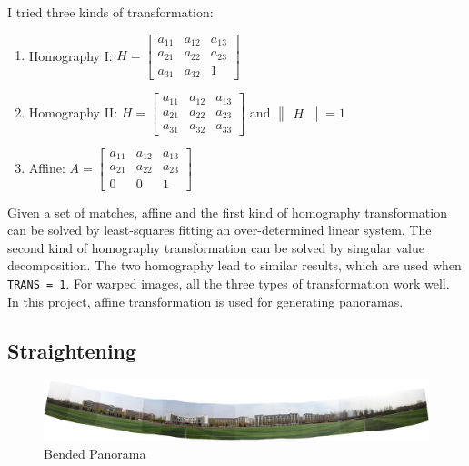 I tried three kinds of transformation:
\begin{enumerate}
  \item Homography I: $H = \begin{bmatrix} a_{11} &a_{12} & a_{13}\\ a_{21} & a_{22} & a_{23}\\ a_{31} & a_{32} & 1\end{bmatrix}$

  \item Homography II:
    $H = \begin{bmatrix} a_{11} &a_{12} & a_{13}\\ a_{21} & a_{22} & a_{23}\\ a_{31} & a_{32} & a_{33}\end{bmatrix} $
    and $\begin{Vmatrix} H \end{Vmatrix} = 1$

  \item Affine:
    $A = \begin{bmatrix} a_{11} &a_{12} & a_{13}\\ a_{21} & a_{22} & a_{23}\\ 0 & 0 & 1\end{bmatrix}$
\end{enumerate}

Given a set of matches, affine and the first kind of homography transformation can be solved
by least-squares fitting an over-determined linear system.
The second kind of homography transformation can be solved by singular value decomposition.
The two homography lead to similar results, which are used when \verb|TRANS = 1|.
For warped images, all the three types of transformation work well.
In this project, affine transformation is used for generating panoramas.

\subsection{Straightening}
\begin{figure}[H]
  \centering
  \includegraphics[width=\textwidth]{res/bend.jpg}
  \caption{Bended Panorama\label{fig:bend}}
\end{figure}

